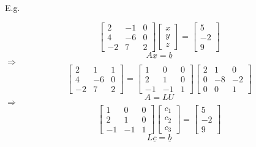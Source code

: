 \documentclass[12pt,a4paper]{article}
\begin{document}
E.g.

\[
\begin{bmatrix}
  2 & -1 & 0 \\
  4 & -6 & 0 \\
  -2 & 7 & 2
\end{bmatrix}
\begin{bmatrix}
  x \\
  y \\
  z
\end{bmatrix} = 
\begin{bmatrix}
  5 \\
  -2 \\
  9
\end{bmatrix}
\]
$$A\underline{x} = \underline{b}$$
$\Rightarrow$
\[
\begin{bmatrix}
  2 & 1 & 1 \\
  4 & -6 & 0 \\
  -2 & 7 & 2
\end{bmatrix} = 
\begin{bmatrix}
  1 & 0 & 0 \\
  2 & 1 & 0 \\
  -1 & -1 & 1
\end{bmatrix}
\begin{bmatrix}
  2 & 1 & 0 \\
  0 & -8 & -2 \\
  0 & 0 & 1
\end{bmatrix}
\]
$$A = LU$$
$\Rightarrow$
\[
\begin{bmatrix}
  1 & 0 & 0 \\
  2 & 1 & 0 \\
  -1 & -1 & 1
\end{bmatrix}
\begin{bmatrix}
  c_1 \\
  c_2 \\
  c_3
\end{bmatrix} =
\begin{bmatrix}
  5 \\
  -2 \\
  9
\end{bmatrix}
\]
$$L\underline{c} = \underline{b}$$
\end{document}
